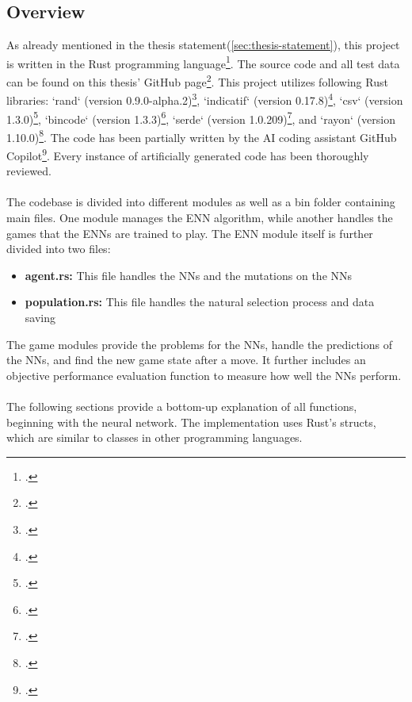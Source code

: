 \documentclass[11pt]{report}
\begin{document}
\begin{enumerate}
    \subsection{Overview}\label{subsec:overview}
    As already mentioned in the thesis statement(\ref{sec:thesis-statement}), this project is written in the Rust programming language\footcite{rust23}.
    The source code and all test data can be found on this thesis' GitHub page\footcite{RustENN}.
    This project utilizes following Rust libraries:
    `rand` (version 0.9.0-alpha.2)\footcite{rand2024},
    `indicatif` (version 0.17.8)\footcite{indicatif2023},
    `csv` (version 1.3.0)\footcite{csv2023},
    `bincode` (version 1.3.3)\footcite{bincode2021},
    `serde` (version 1.0.209)\footcite{serde2024},
    and `rayon` (version 1.10.0)\footcite{rayon2023}.
    The code has been partially written by the AI coding assistant GitHub Copilot\footcite{github_copilot2021}.
    Every instance of artificially generated code has been thoroughly reviewed.
    \\ \\
    The codebase is divided into different modules as well as a bin folder containing main files.
    One module manages the ENN algorithm, while another handles the games that the ENNs are trained to play.
    The ENN module itself is further divided into two files:
    \begin{itemize}
        \item \textbf{agent.rs:} This file handles the NNs and the mutations on the NNs
        \item \textbf{population.rs:} This file handles the natural selection process and data saving
    \end{itemize}
    The game modules provide the problems for the NNs, handle the predictions of the NNs, and find the new game state after a move.
    It further includes an objective performance evaluation function to measure how well the NNs perform.
    \\ \\
    The following sections provide a bottom-up explanation of all functions, beginning with the neural network.
    The implementation uses Rust's structs, which are similar to classes in other programming languages.


\end{enumerate}
\end{document}
